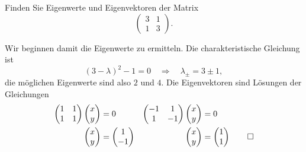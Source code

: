 Finden Sie Eigenwerte und Eigenvektoren der Matrix
\[
\begin{pmatrix}
3&1\\
1&3
\end{pmatrix}.
\]

\begin{loesung}
Wir beginnen damit die Eigenwerte zu ermitteln.
Die charakteristische Gleichung ist
\[
(3-\lambda)^2-1=0\quad\Rightarrow\quad\lambda_{\pm}=3\pm 1,
\]
die möglichen Eigenwerte sind also $2$ und $4$. Die Eigenvektoren sind
Lösungen der Gleichungen
\begin{align*}
\begin{pmatrix}1&1\\1&1\end{pmatrix}\begin{pmatrix}x\\y\end{pmatrix}&=0
&
\begin{pmatrix}-1&1\\1&-1\end{pmatrix}\begin{pmatrix}x\\y\end{pmatrix}&=0
\\
\begin{pmatrix}x\\y\end{pmatrix}&=\begin{pmatrix}1\\-1\end{pmatrix}
&
\begin{pmatrix}x\\y\end{pmatrix}&=\begin{pmatrix}1\\1\end{pmatrix}
\qedhere
\end{align*}
\end{loesung}

